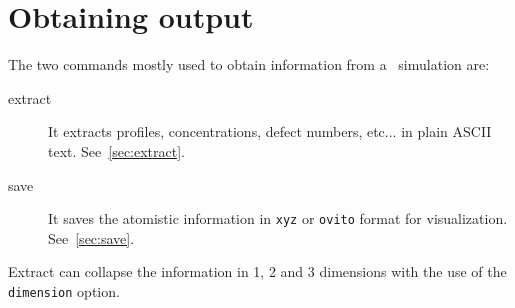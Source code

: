 \section{Obtaining output}

The two commands mostly used to obtain information from a \MMonCa\ simulation are:
\begin{description}
\item[extract]  It extracts profiles, concentrations, defect numbers, etc... in plain ASCII text. See~\ref{sec:extract}.
\item[save] It saves the atomistic information in {\tt xyz} or {\tt ovito} format for visualization. See~\ref{sec:save}.
\end{description}

Extract can collapse the information in 1, 2 and 3 dimensions with the use of the {\tt dimension} option.
